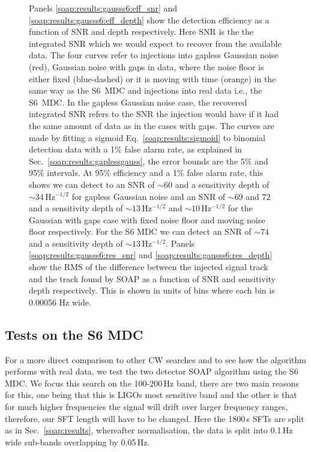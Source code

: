 \begin{figure}[p]
\caption[Sensitivity curves for SOAP search when run on S6 and Gaussian noise.]{Panels \ref{soap:results:gausss6:eff_snr} and \ref{soap:results:gausss6:eff_depth} show the detection efficiency as a function of \gls{SNR} and depth respectively. Here \gls{SNR} is the the integrated \gls{SNR} which we would expect to recover from the available data. The four curves refer to injections into gapless Gaussian noise (red), Gaussian noise with gaps in data, where the noise floor is either fixed (blue-dashed) or it is moving with time (orange) in the same way as the S6~\gls{MDC} and injections into real data i.e., the S6~\gls{MDC}. In the gapless Gaussian noise case, the recovered integrated \gls{SNR} refers to the \gls{SNR} the injection would have if it had the same amount of data as in the cases with gaps.
The curves are made by fitting a sigmoid Eq.~\ref{soap:results:sigmoid} to binomial detection data with a 1\% false alarm rate, as explained in Sec.~\ref{soap:results:gaplessgauss}, the error bounds are the 5\% and 95\% intervals.
At 95\% efficiency and a 1\% false alarm rate, this shows we can detect to an \gls{SNR}  of $\sim 60$ and a sensitivity depth of $\sim 34$\,Hz$^{-1/2}$ for gapless Gaussian noise and an \gls{SNR}  of $\sim 69$ and $72$ and a sensitivity depth of $\sim 13$\,Hz$^{-1/2}$ and $\sim 10$\,Hz$^{-1/2}$ for the Gaussian with gaps case with fixed noise floor and moving noise floor respectively. For the S6 \gls{MDC} we can detect an \gls{SNR} of $\sim 74$ and a sensitivity depth of $\sim 13$\,Hz$^{-1/2}$. 
 Panels \ref{soap:results:gausss6:res_snr} and \ref{soap:results:gausss6:res_depth} show the \gls{RMS} of the difference between the injected signal track and the track found by SOAP as a function of \gls{SNR} and sensitivity depth respectively. This is shown in units of bins where each bin is 0.00056 Hz wide.\label{soap:results:gausss6:plots} }
\end{figure}


\subsection{\label{soap:results:s6}Tests on the S6 MDC}
%
%
For a more direct comparison to other \gls{CW} searches and to see how the
algorithm performs with real data, we test the two detector SOAP algorithm using the S6 \gls{MDC}. We focus this search on the 100-200\,Hz band, there are two main reasons for this, one being that this is \glspl{LIGO} most sensitive band and the other is that for much higher frequencies the signal will drift over larger frequency ranges, therefore, our \gls{SFT} length will have to be changed.
Here the 1800\,s \glspl{SFT} are split as in Sec.~\ref{soap:results}, whereafter normalisation, the data is split into 0.1\,Hz wide sub-bands overlapping by 0.05\,Hz.

